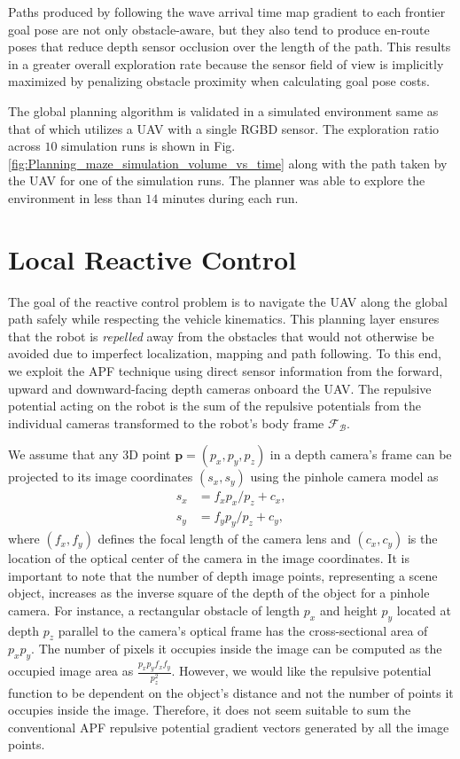 \documentclass[letterpaper, 10 pt, conference]{ieeeconf}  %
\begin{document}
Paths produced by following the wave arrival time map gradient to each frontier goal pose are not only obstacle-aware, but they also tend to produce en-route poses that reduce depth sensor occlusion over the length of the path.  This results in a greater overall exploration rate because the sensor field of view is implicitly maximized by penalizing obstacle proximity when calculating goal pose costs.

The global planning algorithm is validated in a simulated environment same as that of \cite{schmid2020efficient} which utilizes a UAV with a single RGBD sensor. The exploration ratio across $10$ simulation runs is shown in Fig. \ref{fig:Planning_maze_simulation_volume_vs_time} along with the path taken by the UAV for one of the simulation runs. The planner was able to explore the environment in less than $14$ minutes during each run.

\section{Local Reactive Control}
\label{sec:local_planning}

The goal of the reactive control problem is to navigate the UAV along the global path safely while respecting the vehicle kinematics. This planning layer ensures that the robot is \textit{repelled} away from the obstacles that would not otherwise be avoided due to imperfect localization, mapping and path following. To this end, we exploit the APF technique using direct sensor information from the forward, upward and downward-facing depth cameras onboard the UAV. The repulsive potential acting on the robot is the sum of the repulsive potentials from the individual cameras transformed to the robot's body frame $\mathcal{F}_\mathcal{B}$. \par

We assume that any 3D point $\bm{p} = (p_x,p_y,p_z)$ in a depth camera's frame can be projected to its image coordinates $(s_x,s_y)$ using the pinhole camera model as
\begin{align}
    \label{eq:pinhole_model}
    s_x &= f_x p_x / p_z + c_x, \nonumber \\
    s_y &= f_y p_y / p_z + c_y,
\end{align}
where $(f_x,f_y)$ defines the focal length of the camera lens and $(c_x,c_y)$ is the location of the optical center of the camera in the image coordinates. It is important to note that the number of depth image points, representing a scene object, increases as the inverse square of the depth of the object for a pinhole camera. For instance, a rectangular obstacle of length $p_x$ and height $p_y$ located at depth $p_z$ parallel to the camera's optical frame has the cross-sectional area of $p_xp_y$. The number of pixels it occupies inside the image can be computed as the occupied image area as $\frac{p_xp_yf_xf_y}{p_z^2}$. However, we would like the repulsive potential function to be dependent on the object's distance and not the number of points it occupies inside the image. Therefore, it does not seem suitable to sum the conventional APF repulsive potential gradient vectors generated by all the image points.  \par
\end{document}
